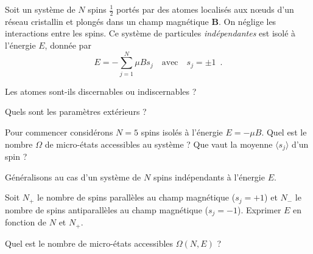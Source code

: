 Soit un système de $N$ spins $\frac12$ portés par des atomes localisés
aux n\oe uds d'un réseau cristallin et plongés dans un champ
magnétique $\mathbf{B}$. On néglige les interactions entre les
spins. Ce système de particules {\it indépendantes} est isolé à l'énergie
$E$, donnée par
$$
E = - \sum_{j=1}^{N} \mu B s_j \quad \textrm{avec} \quad s_j = \pm
1 \enspace .
$$

\question
Les atomes sont-ils discernables ou indiscernables ? 

\question
Quels sont les paramètres extérieurs ? 

\question
Pour commencer considérons $N=5$ spins isolés à l'énergie
$E=-\mu B$. Quel est le nombre $\varOmega$ de micro-états accessibles
au système ? Que vaut la moyenne $\langle s_j \rangle$ d'un spin ? 

\medskip

Généralisons au cas d'un système de $N$ spins indépendants à l'énergie $E$.

\question
Soit $N_+$ le nombre de spins parallèles au champ magnétique ($s_j=+1$) et
$N_-$ le nombre de spins antiparallèles au champ magnétique ($s_j=-1$).
Exprimer  $E$ en fonction de $N$ et $N_+$.  

\question
Quel est le nombre de micro-états accessibles $\varOmega (N,E)$ ?
